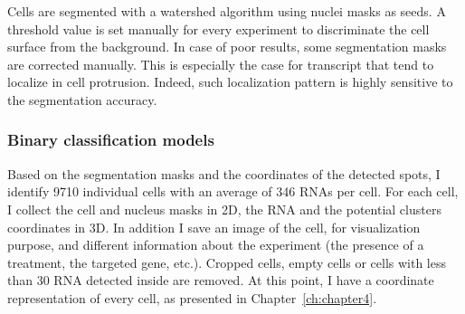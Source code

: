 Cells are segmented with a watershed algorithm using nuclei masks as seeds.
A threshold value is set manually for every experiment to discriminate the cell surface from the background.
In case of poor results, some segmentation masks are corrected manually.
This is especially the case for transcript that tend to localize in cell protrusion.
Indeed, such localization pattern is highly sensitive to the segmentation accuracy.

\subsubsection{Binary classification models}

Based on the segmentation masks and the coordinates of the detected spots, I identify 9710 individual cells with an average of 346 \ac{RNA}s per cell.
For each cell, I collect the cell and nucleus masks in 2D, the \ac{RNA} and the potential clusters coordinates in 3D.
In addition I save an image of the cell, for visualization purpose, and different information about the experiment (the presence of a treatment, the targeted gene, etc.).
Cropped cells, empty cells or cells with less than 30 \ac{RNA} detected inside are removed.
At this point, I have a coordinate representation of every cell, as presented in Chapter~\ref{ch:chapter4}.

